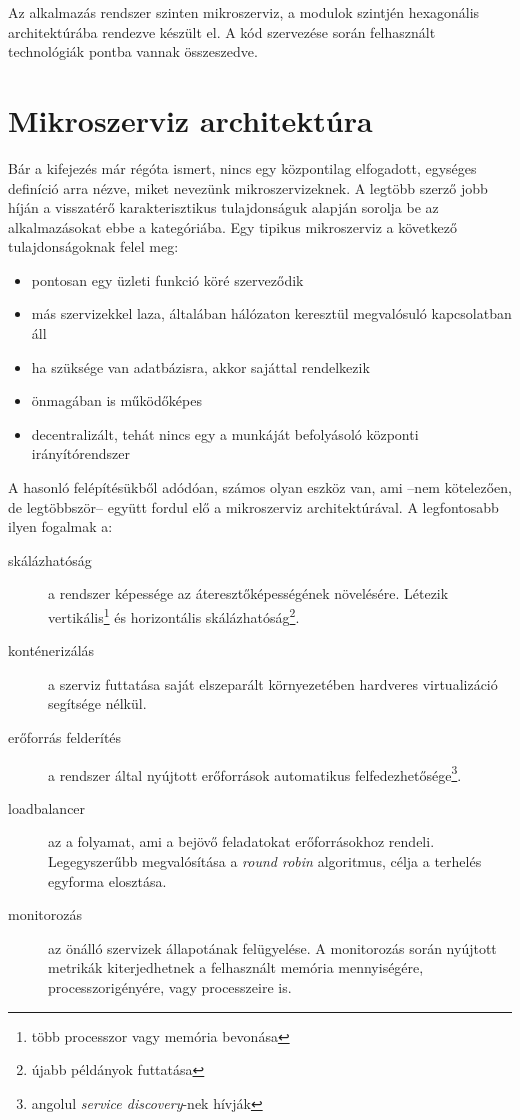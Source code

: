 Az alkalmazás rendszer szinten mikroszerviz, a modulok szintjén hexagonális architektúrába rendezve készült el. A kód szervezése során felhasznált technológiák  pontba vannak összeszedve.


\section{Mikroszerviz architektúra}	
Bár a kifejezés már régóta ismert, nincs egy központilag elfogadott, egységes definíció arra nézve, miket nevezünk mikroszervizeknek. A legtöbb szerző \cite{OReally_Microservice_Architecture} jobb híján a visszatérő karakterisztikus tulajdonságuk alapján sorolja be az alkalmazásokat ebbe a kategóriába. Egy tipikus mikroszerviz a következő tulajdonságoknak felel meg:

\begin{itemize}
	\item	pontosan egy üzleti funkció köré szerveződik 
	\item   más	szervizekkel laza, általában hálózaton keresztül megvalósuló kapcsolatban áll
	\item   ha szüksége van adatbázisra, akkor sajáttal rendelkezik
	\item	önmagában is működőképes	
	\item	decentralizált, tehát nincs egy a munkáját befolyásoló központi irányítórendszer
\end{itemize}

A hasonló felépítésükből adódóan, számos olyan eszköz van, ami --nem kötelezően, de legtöbbször-- együtt fordul elő a mikroszerviz architektúrával. A legfontosabb ilyen fogalmak a:
\begin{description}
	\item[skálázhatóság] a rendszer képessége az áteresztőképességének növelésére.
	Létezik vertikális\footnote{több processzor vagy memória bevonása} és horizontális skálázhatóság\footnote{újabb példányok futtatása}.
	
	\item[konténerizálás] a szerviz futtatása saját elszeparált környezetében hardveres virtualizáció segítsége nélkül.	

	\item[erőforrás felderítés] a rendszer által nyújtott erőforrások automatikus
	felfedezhetősége\footnote{angolul \textit{service discovery}-nek hívják}.
	
	\item[loadbalancer] az a folyamat, ami a bejövő feladatokat erőforrásokhoz rendeli. Legegyszerűbb megvalósítása a \foreignlanguage{british}{\textit{round robin}} algoritmus, célja a terhelés egyforma elosztása.
	
	\item[monitorozás] az önálló szervizek állapotának felügyelése. A monitorozás során nyújtott metrikák kiterjedhetnek a felhasznált memória mennyiségére, processzorigényére, vagy processzeire is.
\end{description}



